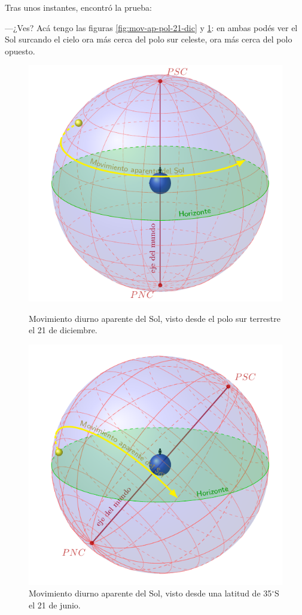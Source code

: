 Tras unos instantes, encontró la prueba:

---¿Ves? Acá tengo las figuras \ref{fig:mov-ap-pol-21-dic} y
\ref{fig:mov-ap-21-jun}: en ambas podés ver el Sol surcando el cielo
ora más cerca del polo sur celeste, ora más cerca del polo opuesto.

\begin{figure}[ht]
\begin{minipage}[t]{0.5\textwidth}
  \centering
  \includegraphics[width=.9\textwidth]{imagenes/movimiento-aparente-solar-polos-21-dic}
  \captionsetup{width=.9\textwidth}
  \caption{Movimiento diurno aparente del Sol, visto desde el polo sur
    terrestre el 21 de diciembre.}
  \label{fig:mov-ap-pol-21-dic}
\end{minipage}%
\begin{minipage}[t]{0.5\textwidth}
 \centering
 \includegraphics[width=.9\textwidth]{imagenes/movimiento-aparente-solar-21-jun}
   \captionsetup{width=.9\textwidth}
   \caption{Movimiento diurno aparente del Sol, visto desde una
     latitud de 35$^{\circ}$S el 21 de junio.}
  \label{fig:mov-ap-21-jun}
\end{minipage}
\end{figure}


